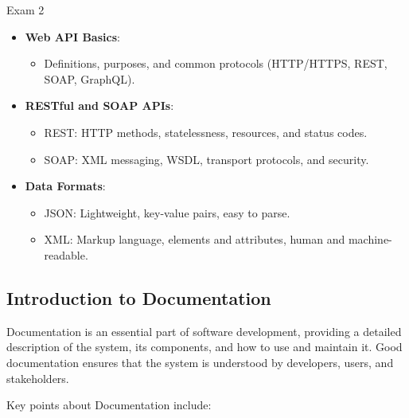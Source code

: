 \begin{examnotes}{Exam 2}
\begin{highlight}
        \begin{itemize}
            \item \textbf{Web API Basics}:
                \begin{itemize}
                    \item Definitions, purposes, and common protocols (HTTP/HTTPS, REST, SOAP, GraphQL).
                \end{itemize}
            \item \textbf{RESTful and SOAP APIs}:
                \begin{itemize}
                    \item REST: HTTP methods, statelessness, resources, and status codes.
                    \item SOAP: XML messaging, WSDL, transport protocols, and security.
                \end{itemize}
            \item \textbf{Data Formats}:
                \begin{itemize}
                    \item JSON: Lightweight, key-value pairs, easy to parse.
                    \item XML: Markup language, elements and attributes, human and machine-readable.
                \end{itemize}
        \end{itemize}
    \end{highlight}

    \subsection*{Introduction to Documentation}

    Documentation is an essential part of software development, providing a detailed description of the system, its components, and how to use and maintain it. Good documentation ensures that the 
    system is understood by developers, users, and stakeholders.
    
    \begin{highlight}
        Key points about Documentation include:
        

\end{highlight}
\end{examnotes}
